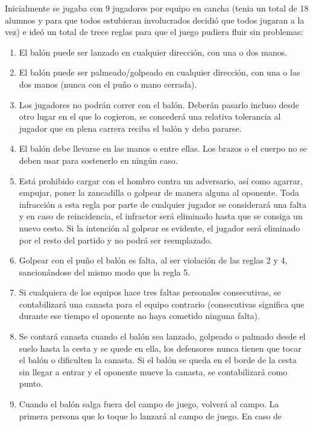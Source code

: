 \documentclass[
]{article}
\providecommand{\tightlist}{%
  \setlength{\itemsep}{0pt}\setlength{\parskip}{0pt}}
\begin{document}
Inicialmente se jugaba con 9 jugadores por equipo en cancha (tenia un
total de 18 alumnos y para que todos estubieran involucrados decidió que
todos jugaran a la vez) e ideó un total de trece reglas para que el
juego pudiera fluir sin problemas:

\begin{enumerate}
\def\labelenumi{\arabic{enumi}.}
\tightlist
\item
  El balón puede ser lanzado en cualquier dirección, con una o dos
  manos.
\item
  El balón puede ser palmeado/golpeado en cualquier dirección, con una o
  las dos manos (nunca con el puño o mano cerrada).
\item
  Los jugadores no podrán correr con el balón. Deberán pasarlo incluso
  desde otro lugar en el que lo cogieron, se concederá una relativa
  tolerancia al jugador que en plena carrera reciba el balón y deba
  pararse.
\item
  El balón debe llevarse en las manos o entre ellas. Los brazos o el
  cuerpo no se deben usar para sostenerlo en ningún caso.
\item
  Está prohibido cargar con el hombro contra un adversario, así como
  agarrar, empujar, poner la zancadilla o golpear de manera alguna al
  oponente. Toda infracción a esta regla por parte de cualquier jugador
  se considerará una falta y en caso de reincidencia, el infractor será
  eliminado hasta que se consiga un nuevo cesto. Si la intención al
  golpear es evidente, el jugador será eliminado por el resto del
  partido y no podrá ser reemplazado.
\item
  Golpear con el puño el balón es falta, al ser violación de las reglas
  2 y 4, sancionándose del mismo modo que la regla 5.
\item
  Si cualquiera de los equipos hace tres faltas personales consecutivas,
  se contabilizará una canasta para el equipo contrario (consecutivas
  significa que durante ese tiempo el oponente no haya cometido ninguna
  falta).
\item
  Se contará canasta cuando el balón sea lanzado, golpeado o palmado
  desde el suelo hasta la cesta y se quede en ella, los defensores nunca
  tienen que tocar el balón o dificulten la canasta. Si el balón se
  queda en el borde de la cesta sin llegar a entrar y el oponente mueve
  la canasta, se contabilizará como punto.
\item
  Cuando el balón salga fuera del campo de juego, volverá al campo. La
  primera persona que lo toque lo lanzará al campo de juego. En caso de

\end{enumerate}
\end{document}
